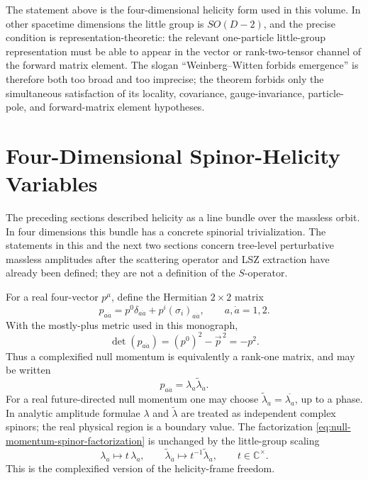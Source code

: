 The statement above is the four-dimensional helicity form used in this
volume.  In other spacetime dimensions the little group is \(SO(D-2)\), and
the precise condition is representation-theoretic: the relevant one-particle
little-group representation must be able to appear in the vector or
rank-two-tensor channel of the forward matrix element.  The slogan
``Weinberg--Witten forbids emergence'' is therefore both too broad and too
imprecise; the theorem forbids only the simultaneous satisfaction of its
locality, covariance, gauge-invariance, particle-pole, and forward-matrix
element hypotheses.

\section{Four-Dimensional Spinor-Helicity Variables}
\label{sec:spinor-helicity-variables}

The preceding sections described helicity as a line bundle over the massless
orbit.  In four dimensions this bundle has a concrete spinorial
trivialization.  The statements in this and the next two sections concern
tree-level perturbative massless amplitudes after the scattering operator and
LSZ extraction have already been defined; they are not a definition of the
\(S\)-operator.

For a real four-vector \(p^\mu\), define the Hermitian \(2\times2\) matrix
\begin{equation}
  p_{a\dot a}
  =
  p^0\delta_{a\dot a}+p^i(\sigma_i)_{a\dot a},
  \qquad
  a,\dot a=1,2.
  \label{eq:spinor-helicity-momentum-matrix}
\end{equation}
With the mostly-plus metric used in this monograph,
\[
  \det(p_{a\dot a})=(p^0)^2-\vec p^{\,2}=-p^2 .
\]
Thus a complexified null momentum is equivalently a rank-one matrix, and may
be written
\begin{equation}
  p_{a\dot a}
  =
  \lambda_a\widetilde\lambda_{\dot a}.
  \label{eq:null-momentum-spinor-factorization}
\end{equation}
For a real future-directed null momentum one may choose
\(\widetilde\lambda_{\dot a}=\overline{\lambda_a}\), up to a phase.  In
analytic amplitude formulae \(\lambda\) and \(\widetilde\lambda\) are treated
as independent complex spinors; the real physical region is a boundary value.
The factorization \eqref{eq:null-momentum-spinor-factorization} is unchanged
by the little-group scaling
\begin{equation}
  \lambda_a\longmapsto t\,\lambda_a,
  \qquad
  \widetilde\lambda_{\dot a}\longmapsto t^{-1}
  \widetilde\lambda_{\dot a},
  \qquad t\in\mathbb C^\times .
  \label{eq:spinor-helicity-little-group-scaling}
\end{equation}
This is the complexified version of the helicity-frame freedom.


